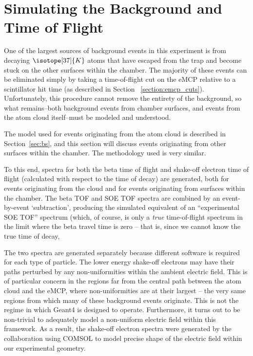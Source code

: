 \section{Simulating the Background and Time of Flight}
\label{sec:tof_bg}
One of the largest sources of background events in this experiment is from decaying $\isotope[37]{K}$ atoms that have escaped from the trap and become stuck on the other surfaces within the chamber.  The majority of these events can be eliminated simply by taking a time-of-flight cut on the eMCP relative to a scintillator hit time (as described in Section ~\ref{section:emcp_cuts}).  Unfortunately, this procedure cannot remove the entirety of the background, so what remains--both background events from chamber surfaces, and events from the atom cloud itself--must be modeled and understood.  

The model used for events originating from the atom cloud is described in Section~\ref{sec:bs}, and this section will discuss events originating from other surfaces within the chamber.  The methodology used is very similar.  

To this end, spectra for both the beta time of flight and shake-off electron time of flight (calculated with respect to the time of decay) are generated, both for events originating from the cloud and for events originating from surfaces within the chamber.  The beta TOF and SOE TOF spectra are combined by an event-by-event `subtraction', producing the simulated equivalent of an ``experimental SOE TOF'' spectrum (which, of course, is only a \emph{true} time-of-flight spectrum in the limit where the beta travel time is zero -- that is, since we cannot know the true time of decay, 


The two spectra are generated separately because different software is required for each type of particle.  The lower energy shake-off electrons may have their paths perturbed by any non-uniformities within the ambient electric field.  This is of particular concern in the regions far from the central path between the atom cloud and the eMCP, where non-uniformities are at their largest -- the very same regions from which many of these background events originate.  This is not the regime in which Geant4 is designed to operate. Furthermore, it turns out to be non-trivial to adequately model a non-uniform electric field within this framework.  As a result, the shake-off electron spectra were generated by the collaboration using COMSOL to model precise shape of the electric field within our experimental geometry.  

